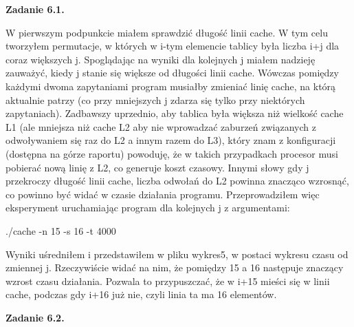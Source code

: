 \documentclass[a4paper]{article}
\begin{document}
\newpage
\textbf{Zadanie 6.1.}

W pierwszym podpunkcie miałem sprawdzić długość linii cache. W tym celu tworzyłem permutacje, w których w i-tym elemencie tablicy była liczba i+j dla coraz większych j. Spoglądając na wyniki dla kolejnych j miałem nadzieję zauważyć, kiedy j stanie się większe od długości linii cache. Wówczas pomiędzy każdymi dwoma zapytaniami program musiałby zmieniać linię cache, na którą aktualnie patrzy (co przy mniejszych j zdarza się tylko przy niektórych zapytaniach). Zadbawszy uprzednio, aby tablica była większa niż wielkość cache L1 (ale mniejsza niż cache L2 aby nie wprowadzać zaburzeń związanych z odwoływaniem się raz do L2 a innym razem do L3), który znam z konfiguracji (dostępna na górze raportu) powoduję, że w takich przypadkach procesor musi pobierać nową linię z L2, co generuje koszt czasowy. Innymi słowy gdy j przekroczy długość linii cache, liczba odwołań do L2 powinna znacząco wzrosnąć, co powinno być widać w czasie działania programu. Przeprowadziłem więc eksperyment uruchamiając program dla kolejnych j z argumentami:
\begin{center}
./cache -n 15 -s 16 -t 4000
\end{center}
Wyniki uśredniłem i przedstawiłem w pliku wykres5, w postaci wykresu czasu od zmiennej j. Rzeczywiście widać na nim, że pomiędzy 15 a 16 następuje znaczący wzrost czasu działania. Pozwala to przypuszczać, że w i+15 mieści się w linii cache, podczas gdy i+16 już nie, czyli linia ta ma 16 elementów.

\textbf{Zadanie 6.2.}
\end{document}

